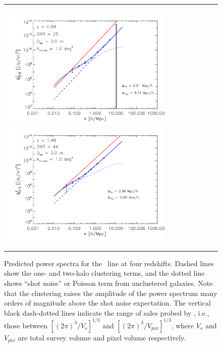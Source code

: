 \begin{figure}[h]
\begin{tabular}{ll}
    \begin{minipage}{3.25in}%
      \begin{center}%
	\includegraphics[width=3.25in]{pcii_z88.pdf}
	\includegraphics[width=3.25in]{pcii_z148.pdf}
      \end{center}
    \end{minipage}
  \end{tabular}
    \caption {\small Predicted power spectra for the \cii\ line at
    four redshifts.  Dashed lines show the one- and two-halo
    clustering terms, and the dotted line shows ``shot noise'' or
    Poisson term from unclustered galaxies.  Note that the clustering
    raises the amplitude of the power spectrum many orders of
    magnitude above the shot noise expectation.  The vertical black
    dash-dotted lines indicate the range of sales probed by \name,
    i.e., those between $[(2 \pi)^3/V_s]^{1/3}$ and
    $[(2\pi)^3/V_{pix}]^{1/3}$, where $V_s$ and $V_{pix}$ are total
    survey volume and pixel volume respectively.}
\label{fig:PowerSpectrum}
\end{figure}

